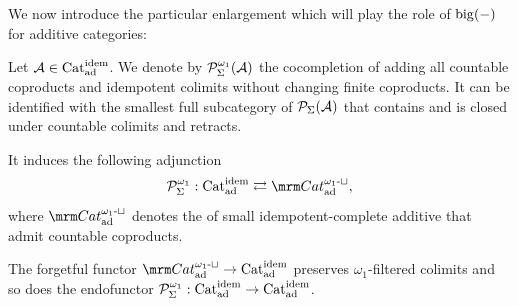 \documentclass[a4paper,10pt, oneside]{amsart}
\begin{document}
We now introduce the particular enlargement which will play the role of
$\mathrm{big}(-)$ for additive categories:
\begin{de}\label{bigpsigma}
	Let $\mathcal{A}\in\mathrm{Cat}_{\mathrm{ad}}^{\mathrm{idem}}$. We denote by  $\mathcal{P}_{\Sigma}^{\omega_1}(\mathcal{A})$ the cocompletion of \mca adding all countable coproducts and idempotent colimits without changing finite coproducts. It can be identified with the smallest full subcategory of $\mathcal{P}_{\Sigma}(\mathcal{A})$ that contains \mca and is closed under countable colimits and retracts. 
\end{de}

\begin{rem}
	It induces the following adjunction 
	$$\mcp_{\Sigma}^{\omega_1}: \catadidem \rightleftarrows\Cat^{\omega_1\text{-}\sqcup}_{\op{ad}},$$ where $\Cat^{\omega_1\text{-}\sqcup}_{\op{ad}}$ denotes the \infcat of small idempotent-complete additive \infcats that admit countable coproducts. 
	
	The forgetful functor $\Cat^{\omega_1\text{-}\sqcup}_{\op{ad}}\to \catadidem$ preserves $\omega_1$-filtered colimits and so does the endofunctor $\mathcal{P}_{\Sigma}^{\omega_1}:\mathrm{Cat}_{\mathrm{ad}}^{\mathrm{idem}}\to\mathrm{Cat}_{\mathrm{ad}}^{\mathrm{idem}}$.
\end{rem}
\end{document}
